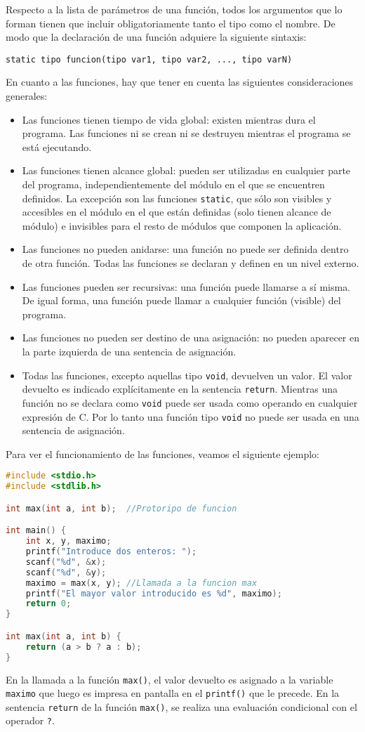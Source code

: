 Respecto a la lista de parámetros de una función, todos los argumentos que lo forman tienen que incluir obligatoriamente tanto el tipo como el nombre. De modo que la declaración de una función adquiere la siguiente sintaxis:

\texttt{static tipo funcion(tipo var1, tipo var2, ..., tipo varN)}

En cuanto a las funciones, hay que tener en cuenta las siguientes consideraciones generales:
\begin{itemize}
	\item Las funciones tienen tiempo de vida global: existen mientras dura el programa. Las funciones ni se crean ni se destruyen mientras el programa se está ejecutando.
	\item Las funciones tienen alcance global: pueden ser utilizadas en cualquier parte del programa, independientemente del módulo en el que se encuentren definidos. La excepción son las funciones \texttt{static}, que sólo son visibles y accesibles en el módulo en el que están definidas (solo tienen alcance de módulo) e invisibles para el resto de módulos que componen la aplicación.
	\item Las funciones no pueden anidarse: una función no puede ser definida dentro de otra función. Todas las funciones se declaran y definen en un nivel externo.
	\item Las funciones pueden ser recursivas: una función puede llamarse a sí misma. De igual forma, una función puede llamar a cualquier función (visible) del programa.
	\item Las funciones no pueden ser destino de una asignación: no pueden aparecer en la parte izquierda de una sentencia de asignación.
	\item Todas las funciones, excepto aquellas tipo \texttt{void}, devuelven un valor. El valor devuelto es indicado explícitamente en la sentencia \texttt{return}. Mientras una función no se declara como \texttt{void} puede ser usada como operando en cualquier expresión de C. Por lo tanto una función tipo \texttt{void} no puede ser usada en una sentencia de asignación.
\end{itemize}
Para ver el funcionamiento de las funciones, veamos el siguiente ejemplo:
\begin{Ejemplo}
\begin{lstlisting}[language=C]
#include <stdio.h>
#include <stdlib.h>

int max(int a, int b);	//Protoripo de funcion

int main() {
    int x, y, maximo;
    printf("Introduce dos enteros: ");
    scanf("%d", &x);
    scanf("%d", &y);
    maximo = max(x, y);	//Llamada a la funcion max
    printf("El mayor valor introducido es %d", maximo);
    return 0;
}

int max(int a, int b) {
    return (a > b ? a : b);
}
\end{lstlisting}
\Explicacion
En la llamada a la función \texttt{max()}, el valor devuelto es asignado a la variable \texttt{maximo} que luego es impresa en pantalla en el \texttt{printf()} que le precede. En la sentencia \texttt{return} de la función \texttt{max()}, se realiza una evaluación condicional con el operador \texttt{?}.
\end{Ejemplo}
